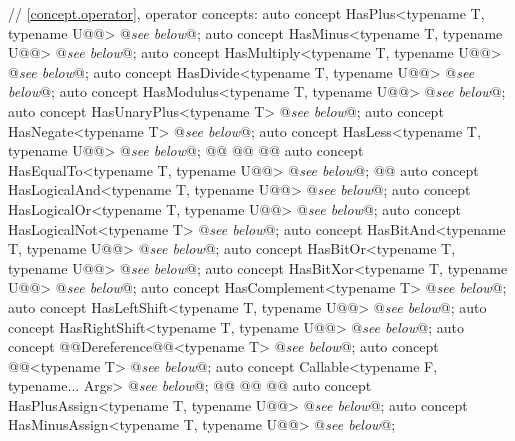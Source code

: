 \documentclass[american,twoside]{book}
\begin{document}
\begin{codeblock}
{  // \ref{concept.operator}, operator concepts:
  auto concept HasPlus<typename T, typename U@@> @\textit{see below}@;
  auto concept HasMinus<typename T, typename U@@> @\textit{see below}@;
  auto concept HasMultiply<typename T, typename U@@> @\textit{see below}@;
  auto concept HasDivide<typename T, typename U@@> @\textit{see below}@;
  auto concept HasModulus<typename T, typename U@@> @\textit{see below}@;
  auto concept HasUnaryPlus<typename T> @\textit{see below}@;
  auto concept HasNegate<typename T> @\textit{see below}@;
  auto concept HasLess<typename T, typename U@@> @\textit{see below}@;
  @@
  @@
  @@
  auto concept HasEqualTo<typename T, typename U@@> @\textit{see below}@;
  @@
  auto concept HasLogicalAnd<typename T, typename U@@> @\textit{see below}@;
  auto concept HasLogicalOr<typename T, typename U@@> @\textit{see below}@;
  auto concept HasLogicalNot<typename T> @\textit{see below}@;
  auto concept HasBitAnd<typename T, typename U@@> @\textit{see below}@;
  auto concept HasBitOr<typename T, typename U@@> @\textit{see below}@;
  auto concept HasBitXor<typename T, typename U@@> @\textit{see below}@;
  auto concept HasComplement<typename T> @\textit{see below}@;
  auto concept HasLeftShift<typename T, typename U@@> @\textit{see below}@;
  auto concept HasRightShift<typename T, typename U@@> @\textit{see below}@;
  auto concept @@Dereference@@<typename T> @\textit{see below}@;
  auto concept @@<typename T> @\textit{see below}@;
  auto concept Callable<typename F, typename... Args> @\textit{see below}@;
  @@
  @@
  @@
  auto concept HasPlusAssign<typename T, typename U@@> @\textit{see below}@;
  auto concept HasMinusAssign<typename T, typename U@@> @\textit{see below}@;
}
\end{codeblock}
\end{document}
